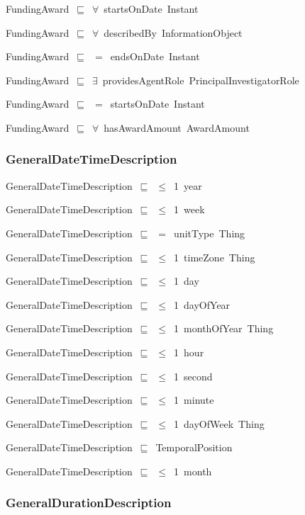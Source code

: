 \documentclass{article}
\begin{document}
FundingAward~\ensuremath{\sqsubseteq}~\ensuremath{\forall}~startsOnDate~Instant~

FundingAward~\ensuremath{\sqsubseteq}~\ensuremath{\forall}~describedBy~InformationObject~

FundingAward~\ensuremath{\sqsubseteq}~\ensuremath{=}~endsOnDate~Instant~

FundingAward~\ensuremath{\sqsubseteq}~\ensuremath{\exists}~providesAgentRole~PrincipalInvestigatorRole~

FundingAward~\ensuremath{\sqsubseteq}~\ensuremath{=}~startsOnDate~Instant~

FundingAward~\ensuremath{\sqsubseteq}~\ensuremath{\forall}~hasAwardAmount~AwardAmount~

\subsubsection*{GeneralDateTimeDescription}

GeneralDateTimeDescription~\ensuremath{\sqsubseteq}~\ensuremath{\leq}~1~year~

GeneralDateTimeDescription~\ensuremath{\sqsubseteq}~\ensuremath{\leq}~1~week~

GeneralDateTimeDescription~\ensuremath{\sqsubseteq}~\ensuremath{=}~unitType~Thing~

GeneralDateTimeDescription~\ensuremath{\sqsubseteq}~\ensuremath{\leq}~1~timeZone~Thing~

GeneralDateTimeDescription~\ensuremath{\sqsubseteq}~\ensuremath{\leq}~1~day~

GeneralDateTimeDescription~\ensuremath{\sqsubseteq}~\ensuremath{\leq}~1~dayOfYear~

GeneralDateTimeDescription~\ensuremath{\sqsubseteq}~\ensuremath{\leq}~1~monthOfYear~Thing~

GeneralDateTimeDescription~\ensuremath{\sqsubseteq}~\ensuremath{\leq}~1~hour~

GeneralDateTimeDescription~\ensuremath{\sqsubseteq}~\ensuremath{\leq}~1~second~

GeneralDateTimeDescription~\ensuremath{\sqsubseteq}~\ensuremath{\leq}~1~minute~

GeneralDateTimeDescription~\ensuremath{\sqsubseteq}~\ensuremath{\leq}~1~dayOfWeek~Thing~

GeneralDateTimeDescription~\ensuremath{\sqsubseteq}~TemporalPosition~

GeneralDateTimeDescription~\ensuremath{\sqsubseteq}~\ensuremath{\leq}~1~month~

\subsubsection*{GeneralDurationDescription}
\end{document}
